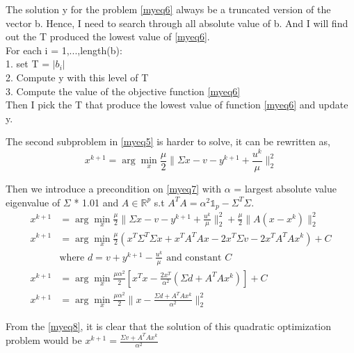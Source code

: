 \documentclass[a4paper,11pt]{article}
\begin{document}
	The solution y for the problem \eqref{myeq6} always be a truncated version of the vector b. Hence, I need to search through all absolute value of b. And I will find out the T produced the lowest value of \eqref{myeq6}.\\
	
	For each i = 1,...,length(b):\\
	
	1. set T = $|b_i|$\\
	
	2. Compute y with this level of T\\
	
	3. Compute the value of the objective function \eqref{myeq6}\\
	
	Then I pick the T that produce the lowest value of function \eqref{myeq6} and update y. 
	
	The second subproblem in \eqref{myeq5} is harder to solve, it can be rewritten as, 
	\[
	x^{k+1} = \arg\!\min_x \frac{\mu}{2}\|\Sigma{x}-v-y^{k+1}+\frac{u^k}{\mu}\|_{2}^2 
	\tag{7}\label{myeq7}
	\]
		
	Then we introduce a precondition on \eqref{myeq7} with $\alpha$ =  largest absolute value eigenvalue of $\Sigma$ * 1.01 and $A \in \mathbb{R}^p$ s.t $A^TA = \alpha^2\mathds{1}_p - \Sigma^T\Sigma$.
	\begin{align*}
	x^{k+1} &= \arg\!\min_x \frac{\mu}{2}\|\Sigma{x}-v-y^{k+1}+\frac{u^k}{\mu}\|_{2}^2  +\frac{\mu}{2}\|A(x-x^k)\|_{2}^2\\
	x^{k+1} &= \arg\!\min_x \frac{\mu}{2}(x^T\Sigma^T\Sigma{x} + x^TA^TA{x}-2x^T\Sigma{v} - 2x^TA^TA{x^k}) + C\\
	&\text{where } d = v +y^{k+1}-\frac{u^k}{\mu} \text{ and constant } C\\
	x^{k+1} &= \arg\!\min_x \frac{\mu\alpha^2}{2}[x^Tx-\frac{2x^T}{\alpha^2}(\Sigma{d}+A^TA{x^k})]+ C\\
	x^{k+1} &= \arg\!\min_x \frac{\mu\alpha^2}{2}\|x-\frac{\Sigma{d}+A^TA{x^k}}{\alpha^2}\|_{2}^2
	\tag{8}\label{myeq8}
	\end{align*}
	
	From the \eqref{myeq8}, it is clear that the solution of this quadratic optimization problem would be $x^{k+1} = \frac{\Sigma{v}+A^TA{x^k}}{\alpha^2}$
\end{document}
